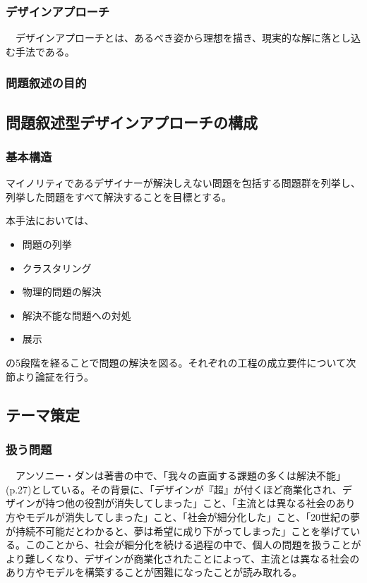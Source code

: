 \documentclass{jsarticle}
\begin{document}
\subsubsection{デザインアプローチ}
　デザインアプローチとは、あるべき姿から理想を描き、現実的な解に落とし込む手法である。

\subsubsection{問題叙述の目的}


\subsubsection{}


\newpage
\subsection{問題叙述型デザインアプローチの構成}
\subsubsection{基本構造}
マイノリティであるデザイナーが解決しえない問題を包括する問題群を列挙し、列挙した問題をすべて解決することを目標とする。

本手法においては、
\begin{itemize}
  \item{問題の列挙}
  \item{クラスタリング}
  \item{物理的問題の解決}
  \item{解決不能な問題への対処}
  \item{展示}
\end{itemize}
の5段階を経ることで問題の解決を図る。それぞれの工程の成立要件について次節より論証を行う。

\subsection{テーマ策定}


\subsubsection{扱う問題}
　アンソニー・ダンは著書の中で、「我々の直面する課題の多くは解決不能」(p.27)としている。その背景に、「デザインが『超』が付くほど商業化され、デザインが持つ他の役割が消失してしまった」こと、「主流とは異なる社会のあり方やモデルが消失してしまった」こと、「社会が細分化した」こと、「20世紀の夢が持続不可能だとわかると、夢は希望に成り下がってしまった」ことを挙げている。このことから、社会が細分化を続ける過程の中で、個人の問題を扱うことがより難しくなり、デザインが商業化されたことによって、主流とは異なる社会のあり方やモデルを構築することが困難になったことが読み取れる。
\end{document}
